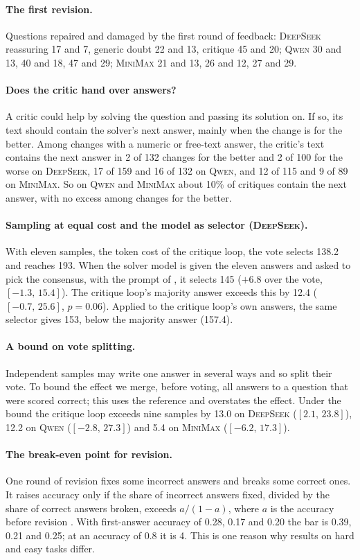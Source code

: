 \documentclass[11pt]{article}
\newcommand{\ds}{\textsc{DeepSeek}}
\newcommand{\qw}{\textsc{Qwen}}
\newcommand{\mm}{\textsc{MiniMax}}
\newcommand{\ci}[2]{$[#1,\,#2]$}
\begin{document}
\paragraph{The first revision.}
Questions repaired and damaged by the first round of feedback: \ds{} reassuring 17 and 7, generic doubt 22 and 13, critique 45 and 20; \qw{} 30 and 13, 40 and 18, 47 and 29; \mm{} 21 and 13, 26 and 12, 27 and 29.

\paragraph{Does the critic hand over answers?}
A critic could help by solving the question and passing its solution on.
If so, its text should contain the solver's next answer, mainly when the change is for the better.
Among changes with a numeric or free-text answer, the critic's text contains the next answer in 2 of 132 changes for the better and 2 of 100 for the worse on \ds, 17 of 159 and 16 of 132 on \qw, and 12 of 115 and 9 of 89 on \mm.
So on \qw{} and \mm{} about 10\% of critiques contain the next answer, with no excess among changes for the better.

\paragraph{Sampling at equal cost and the model as selector (\ds).}
With eleven samples, the token cost of the critique loop, the vote selects 138.2 and reaches 193.
When the solver model is given the eleven answers and asked to pick the consensus, with the prompt of \citet{chen2023usc}, it selects 145 ($+6.8$ over the vote, \ci{-1.3}{15.4}).
The critique loop's majority answer exceeds this by 12.4 (\ci{-0.7}{25.6}, $p=0.06$).
Applied to the critique loop's own answers, the same selector gives 153, below the majority answer (157.4).

\paragraph{A bound on vote splitting.}
Independent samples may write one answer in several ways and so split their vote.
To bound the effect we merge, before voting, all answers to a question that were scored correct; this uses the reference and overstates the effect.
Under the bound the critique loop exceeds nine samples by 13.0 on \ds{} (\ci{2.1}{23.8}), 12.2 on \qw{} (\ci{-2.8}{27.3}) and 5.4 on \mm{} (\ci{-6.2}{17.3}).

\paragraph{The break-even point for revision.}
One round of revision fixes some incorrect answers and breaks some correct ones.
It raises accuracy only if the share of incorrect answers fixed, divided by the share of correct answers broken, exceeds $a/(1-a)$, where $a$ is the accuracy before revision \citep{yang2024confidence}.
With first-answer accuracy of 0.28, 0.17 and 0.20 the bar is 0.39, 0.21 and 0.25; at an accuracy of 0.8 it is 4.
This is one reason why results on hard and easy tasks differ.
\end{document}
